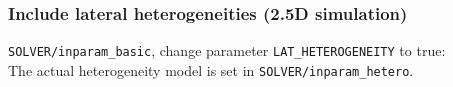 \documentclass[11pt,letter,fleqn,english,notitlepage]{article}
\begin{document}
\subsubsection{Include lateral heterogeneities (2.5D simulation)}
\verb|SOLVER/inparam_basic|, change parameter \verb|LAT_HETEROGENEITY| to true:\\
The actual heterogeneity model is set in \verb|SOLVER/inparam_hetero|. 

% 
% 
% 
% 
% 
% 
\end{document}
